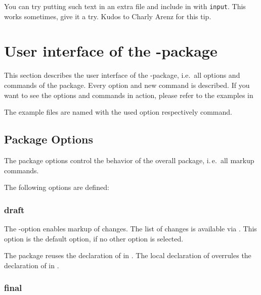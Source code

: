 You can try putting such text in an extra file and include in with \texttt{input}.
This works sometimes, give it a try.
Kudos to Charly Arenz for this tip.


\cleardoublepage
\section{User interface of the -package}
\label{sec:ui}

This section describes the user interface of the -package, i.e.\ all options and commands of the package.
Every option and new command is described.
If you want to see the options and commands in action, please refer to the examples in


The example files are named with the used option respectively command.

\subsection{Package Options}
\label{sec:ui:options}


The package options control the behavior of the overall package, i.\,e.\ all markup commands.

The following options are defined:

\localtableofcontents



\subsubsection{draft}


The -option enables markup of changes.
The list of changes is available via .
This option is the default option, if no other option is selected.

The  package reuses the declaration of  in .
The local declaration of  overrules the declaration of  in .

\subsubsection{final}

